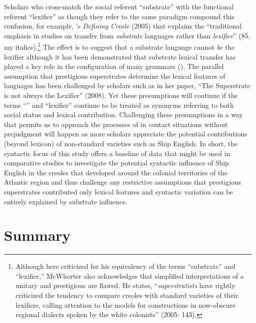 Scholars who cross-match the social referent “substrate” with the functional referent “lexifier” as though they refer to the same paradigm compound this confusion, for example, \citeauthor{McWhorter2005}’s \textit{Defining Creole} (2005) that explains the “traditional emphasis in  studies on transfer from \textit{substrate} languages rather than \textit{lexifier}” (85, my italics).\footnote{Although here criticized for his equivalency of the terms “substrate” and “lexifier,” McWhorter also acknowledges that simplified interpretations of a unitary and prestigious  are flawed. He states, “\textit{superstratists} have rightly criticized the tendency to compare creoles with standard varieties of their lexifiers, calling attention to the models for  constructions in now-obscure regional dialects spoken by the white colonists” (2005: 143).}  The effect is to suggest that a substrate language cannot \textit{be} the lexifier although it has been demonstrated that substrate lexical transfer has played a key role in the configuration of many  grammars (\citealt{Kihm1989,Migge1998}). The parallel assumption that prestigious superstrates determine the lexical features of  languages has been challenged by scholars such as \citeauthor{Selbach2008} in her paper, “The Superstrate is not always the Lexifier” (2008). Yet these presumptions will continue if the terms “” and “lexifier” continue to be treated as synonyms referring to both social status and lexical contribution. Challenging these presumptions in a way that permits us to approach the processes of  in contact situations without prejudgment will happen as more scholars appreciate the potential contributions (beyond lexicon) of non-standard varieties such as Ship English. In short, the syntactic focus of this study offers a baseline of data that might be used in comparative studies to investigate the potential syntactic influence of Ship English in the creoles that developed around the colonial territories of the Atlantic region and thus challenge any restrictive assumptions that prestigious superstrates contributed only lexical features and syntactic variation can be entirely explained by substrate influence. 

\section{{Summary}}%

